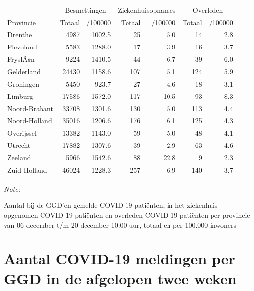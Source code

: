 \documentclass[
  english,
  man,floatsintext]{apa6}
\begin{document}
\begin{table}
\centering
\begin{threeparttable}
\begin{tabular}{lrrrrrr}
\toprule
\multicolumn{1}{c}{ } & \multicolumn{2}{c}{Besmettingen} & \multicolumn{2}{c}{Ziekenhuisopnames} & \multicolumn{2}{c}{Overleden} \\
\cmidrule(l{3pt}r{3pt}){2-3} \cmidrule(l{3pt}r{3pt}){4-5} \cmidrule(l{3pt}r{3pt}){6-7}
Provincie & Totaal & /100000 & Totaal & /100000 & Totaal & /100000\\
\midrule
Drenthe & 4987 & 1002.5 & 25 & 5.0 & 14 & 2.8\\
Flevoland & 5583 & 1288.0 & 17 & 3.9 & 16 & 3.7\\
FryslÃ¢n & 9224 & 1410.5 & 44 & 6.7 & 39 & 6.0\\
Gelderland & 24430 & 1158.6 & 107 & 5.1 & 124 & 5.9\\
Groningen & 5450 & 923.7 & 27 & 4.6 & 18 & 3.1\\
Limburg & 17586 & 1572.0 & 117 & 10.5 & 93 & 8.3\\
Noord-Brabant & 33708 & 1301.6 & 130 & 5.0 & 113 & 4.4\\
Noord-Holland & 35016 & 1206.6 & 176 & 6.1 & 125 & 4.3\\
Overijssel & 13382 & 1143.0 & 59 & 5.0 & 48 & 4.1\\
Utrecht & 17882 & 1307.6 & 39 & 2.9 & 63 & 4.6\\
Zeeland & 5966 & 1542.6 & 88 & 22.8 & 9 & 2.3\\
Zuid-Holland & 46024 & 1228.3 & 257 & 6.9 & 140 & 3.7\\
\bottomrule
\end{tabular}
\begin{tablenotes}
\item \textit{Note: } 
\item Aantal bij de GGD’en gemelde COVID-19 patiënten, in het ziekenhuis opgenomen COVID-19 patiënten en overleden COVID-19 patiënten per provincie van 06 december t/m 20 december 10:00 uur, totaal en per 100.000 inwoners
\end{tablenotes}
\end{threeparttable}
\end{table}

\newpage

\hypertarget{aantal-covid-19-meldingen-per-ggd-in-de-afgelopen-twee-weken}{%
\section{Aantal COVID-19 meldingen per GGD in de afgelopen twee weken}\label{aantal-covid-19-meldingen-per-ggd-in-de-afgelopen-twee-weken}}
\end{document}

